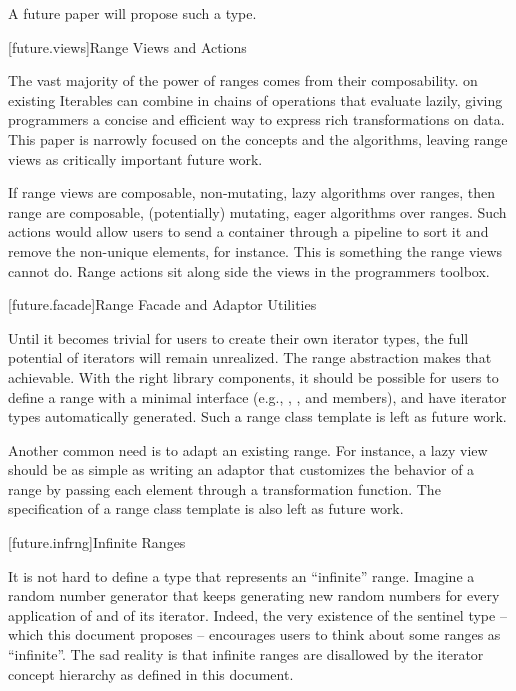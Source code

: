 \pnum
A future paper will propose such a type.

[future.views]{Range Views and Actions}

\pnum
The vast majority of the power of ranges comes from their composability.  on existing Iterables
can combine in chains of operations that evaluate lazily, giving programmers a concise and efficient
way to express rich transformations on data. This paper is narrowly focused on the concepts and the
algorithms, leaving range views as critically important future work.

\pnum
If range views are composable, non-mutating, lazy algorithms over ranges, then range 
are composable, (potentially) mutating, eager algorithms over ranges. Such actions would allow users
to send a container through a pipeline to sort it and remove the non-unique elements, for instance.
This is something the range views cannot do. Range actions sit along side the views in the
programmers toolbox.

[future.facade]{Range Facade and Adaptor Utilities}

\pnum
Until it becomes trivial for users to create their own iterator types, the full potential of
iterators will remain unrealized. The range abstraction makes that achievable. With the right library
components, it should be possible for users to define a range with a minimal interface
(e.g., , , and  members), and have iterator types
automatically generated. Such a range  class template is left as future work.

\pnum
Another common need is to adapt an existing range. For instance, a lazy  view
should be as simple as writing an adaptor that customizes the behavior of a range by passing each
element through a transformation function. The specification of a range  class
template is also left as future work.

[future.infrng]{Infinite Ranges}

\pnum
It is not hard to define a type that represents an ``infinite'' range. Imagine a random number
generator that keeps generating new random numbers for every application of 
and  of its iterator. Indeed, the very existence of the 
sentinel type -- which this document proposes -- encourages users to think about some ranges as
``infinite''. The sad reality is that infinite ranges are disallowed by the iterator concept
hierarchy as defined in this document.

